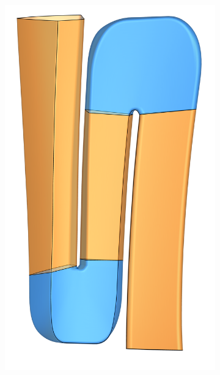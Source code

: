 \documentclass[8pt, aspectratio=169]{beamer}
\begin{document}
\begin{frame}
\begin{minipage}[t]{.8\textwidth}
\begin{figure}[H]
\begin{subfigure}{.49\textwidth}
				\includegraphics[width=.5\textwidth]{../../tec/complete/021.png}
			\end{subfigure}
		\end{figure}
	\end{minipage}
	\vfill
\end{frame}
\end{document}
